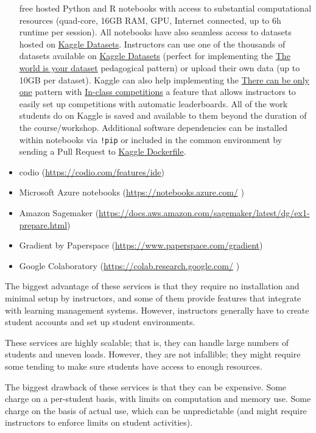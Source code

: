 \documentclass[]{book}
\begin{document}
\begin{itemize}
  free hosted Python and R notebooks with access to substantial computational
  resources (quad-core, 16GB RAM, GPU, Internet connected, up to 6h runtime per
  session). All notebooks have also seamless access to datasets hosted on
  \href{https://www.kaggle.com/datasets}{Kaggle Datasets}. Instructors can use one of
  the thousands of datasets available on
  \href{https://www.kaggle.com/datasets}{Kaggle Datasets} (perfect for implementing
  the \protect\hyperlink{the-world-is-your-dataset}{The world is your dataset} pedagogical
  pattern) or upload their own data (up to 10GB per dataset). Kaggle
  can also help implementing the \protect\hyperlink{there-can-be-only-one}{There can be only one}
  pattern with
  \href{https://www.kaggle.com/about/inclass/overview}{In-class competitions}
  a feature that allows instructors to easily set up competitions with automatic
  leaderboards. All of the work students do on Kaggle is saved and available
  to them beyond the duration of the course/workshop. Additional software
  dependencies can be installed within notebooks via \texttt{!pip} or included in the
  common environment by sending a Pull Request to
  \href{https://github.com/Kaggle/docker-python}{Kaggle Dockerfile}.
\item
  codio
  (\url{https://codio.com/features/ide})
\item
  Microsoft Azure notebooks
  (\url{https://notebooks.azure.com/} )
\item
  Amazon Sagemaker
  (\url{https://docs.aws.amazon.com/sagemaker/latest/dg/ex1-prepare.html})
\item
  Gradient by Paperspace
  (\url{https://www.paperspace.com/gradient})
\item
  Google Colaboratory
  (\url{https://colab.research.google.com/}
  )
\end{itemize}

The biggest advantage of these services is that they require no
installation and minimal setup by instructors, and some of them
provide features that integrate with learning management systems.
However, instructors generally have to create student accounts and set
up student environments.

These services are highly scalable; that is, they can handle large
numbers of students and uneven loads. However, they are not
infallible; they might require some tending to make sure students have
access to enough resources.

The biggest drawback of these services is that they can be expensive.
Some charge on a per-student basis, with limits on computation and
memory use. Some charge on the basis of actual use, which can be
unpredictable (and might require instructors to enforce limits on
student activities).
\end{document}

